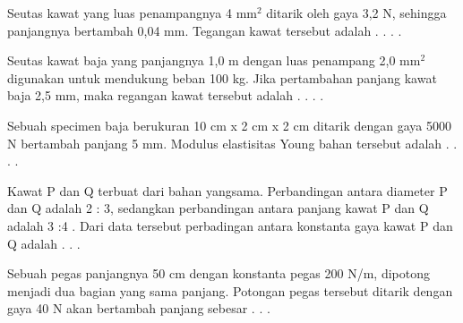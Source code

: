 \item Seutas kawat yang luas penampangnya 4 mm$^2$ ditarik oleh gaya 3,2 N, sehingga panjangnya bertambah 0,04 mm. Tegangan kawat tersebut adalah . . . .

\item Seutas kawat baja yang panjangnya 1,0 m dengan luas penampang 2,0 mm$^2$ digunakan untuk mendukung beban 100 kg. Jika pertambahan panjang kawat baja 2,5 mm, maka regangan kawat tersebut adalah . . . .

\item Sebuah specimen baja berukuran 10 cm x 2 cm x 2 cm ditarik dengan gaya 5000 N bertambah panjang 5 mm. Modulus elastisitas Young bahan tersebut adalah . . . .

\item Kawat P dan Q terbuat dari bahan yangsama. Perbandingan antara diameter P dan Q adalah 2 : 3, sedangkan perbandingan antara panjang kawat P dan Q adalah 3 :4 . Dari data tersebut perbadingan antara konstanta gaya kawat P dan Q adalah . .  .

\item Sebuah pegas panjangnya 50 cm dengan konstanta pegas 200 N/m, dipotong menjadi dua bagian yang sama panjang. Potongan pegas tersebut ditarik dengan gaya 40 N akan bertambah panjang sebesar . . . 
\pilgan{
\item 5 cm
\item 10 cm
\item 15 cm
\item 20 cm
\item 25 cm
}

